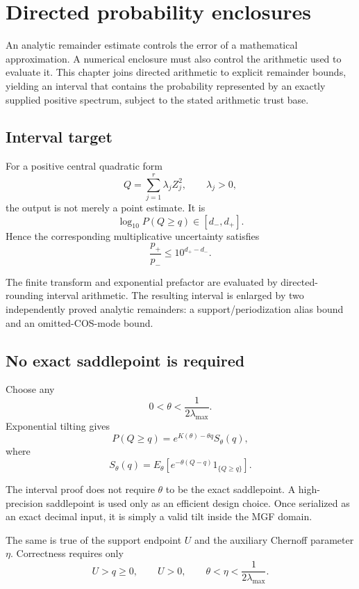 \chapter{Directed probability enclosures}\label{ch:intervals}

\label{sec:final-4}

An analytic remainder estimate controls the error of a mathematical
approximation. A numerical enclosure must also control the arithmetic used
to evaluate it. This chapter joins directed arithmetic to explicit
remainder bounds, yielding an interval that contains the probability
represented by an exactly supplied positive spectrum, subject to the stated
arithmetic trust base.

\section{Interval target}

For a positive central quadratic form
\[
Q=\sum_{j=1}^{r}\lambda_jZ_j^2,
\qquad
\lambda_j>0,
\]
the output is not merely a point estimate.  It is
\[
\boxed{
\log_{10}P(Q\ge q)\in[d_-,d_+].
}
\]
Hence the corresponding multiplicative uncertainty satisfies
\[
\boxed{
\frac{p_+}{p_-}\le 10^{d_+-d_-}.
}
\]

The finite transform and exponential prefactor are evaluated by
directed-rounding interval arithmetic.  The resulting interval is enlarged by
two independently proved analytic remainders: a support/periodization alias
bound and an omitted-COS-mode bound.

\section{No exact saddlepoint is required}

Choose any
\[
0<\theta<\frac{1}{2\lambda_{\max}}.
\]
Exponential tilting gives
\[
P(Q\ge q)
=
e^{K(\theta)-\theta q}
S_\theta(q),
\]
where
\[
S_\theta(q)
=
E_\theta\!\left[
e^{-\theta(Q-q)}
1_{\{Q\ge q\}}
\right].
\]

The interval proof does not require \(\theta\) to be the exact saddlepoint.
A high-precision saddlepoint is used only as an efficient design choice.
Once serialized as an exact decimal input, it is simply a valid tilt inside
the MGF domain.

The same is true of the support endpoint \(U\) and the auxiliary Chernoff
parameter \(\eta\).  Correctness requires only
\[
U>q\ge0,\qquad U>0,
\qquad
\theta<\eta<\frac{1}{2\lambda_{\max}}.
\]

